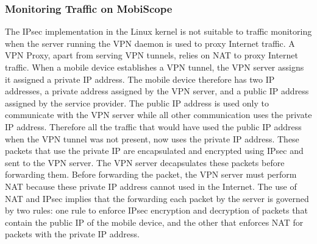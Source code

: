 



\subsubsection{Monitoring Traffic on MobiScope}
\label{sec:monit-traff-mobiscope}




The IPsec implementation in the Linux kernel is not suitable to
traffic monitoring when the server running the VPN daemon is used to
proxy Internet traffic.  A VPN Proxy, apart from serving VPN tunnels,
relies on NAT to proxy Internet traffic.  When a mobile device
establishes a VPN tunnel, the VPN server assigns it assigned a private
IP address.  The mobile device therefore has two IP addresses, a
private address assigned by the VPN server, and a public IP address
assigned by the service provider.  The public IP address is used only
to communicate with the VPN server while all other communication uses
the private IP address.  Therefore all the traffic that would have
used the public IP address when the VPN tunnel was not present, now
uses the private IP address.  These packets that use the private IP
are encapsulated and encrypted using IPsec and sent to the VPN server.
The VPN server decapsulates these packets before forwarding them.
Before forwarding the packet, the VPN server must perform NAT because
these private IP address cannot used in the Internet.  The use of NAT
and IPsec implies that the forwarding each packet by the server is
governed by two rules: one rule to enforce IPsec encryption and
decryption of packets that contain the public IP of the mobile device,
and the other that enforces NAT for packets with the private IP
address.

